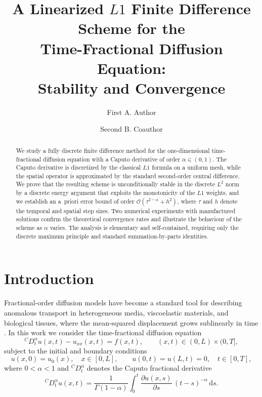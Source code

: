 \documentclass[11pt]{ajam}
\title{A Linearized $L1$ Finite Difference Scheme for the\\
       Time-Fractional Diffusion Equation:\\
       Stability and Convergence}
\author[1]{First A. Author}
\author[1,2]{Second B. Coauthor}
\affil[1]{Laboratory of Applied Mathematics, Kasdi Merbah University, Ouargla, Algeria}
\affil[2]{Department of Mathematics, Partner University, City, Country}
\newcommand{\dtt}{{}^{C}\!D_t^{\alpha}}
\newcommand{\Gam}{\Gamma}
\begin{document}
\maketitle

\begin{abstract}
We study a fully discrete finite difference method for the one-dimensional
time-fractional diffusion equation with a Caputo derivative of order
$\alpha\in(0,1)$. The Caputo derivative is discretized by the classical
$L1$ formula on a uniform mesh, while the spatial operator is approximated
by the standard second-order central difference. We prove that the
resulting scheme is unconditionally stable in the discrete $L^2$ norm by a
discrete energy argument that exploits the monotonicity of the $L1$
weights, and we establish an a~priori error bound of order
$\mathcal{O}(\tau^{2-\alpha}+h^2)$, where $\tau$ and $h$ denote the temporal
and spatial step sizes. Two numerical experiments with manufactured
solutions confirm the theoretical convergence rates and illustrate the
behaviour of the scheme as $\alpha$ varies. The analysis is elementary and
self-contained, requiring only the discrete maximum principle and standard
summation-by-parts identities.
\end{abstract}

\section{Introduction}\label{sec:intro}
Fractional-order diffusion models have become a standard tool for
describing anomalous transport in heterogeneous media, viscoelastic
materials, and biological tissues, where the mean-squared displacement
grows sublinearly in time \citep{Podlubny1999,KilbasSrivastavaTrujillo2006}.
In this work we consider the time-fractional diffusion equation
\begin{equation}\label{eq:pde}
  \dtt u(x,t) - u_{xx}(x,t) = f(x,t),
  \qquad (x,t)\in(0,L)\times(0,T],
\end{equation}
subject to the initial and boundary conditions
\begin{equation}\label{eq:bc}
  u(x,0)=u_0(x),\quad x\in[0,L],
  \qquad u(0,t)=u(L,t)=0,\quad t\in[0,T],
\end{equation}
where $0<\alpha<1$ and $\dtt$ denotes the Caputo fractional derivative
\begin{equation}\label{eq:caputo}
  \dtt u(x,t) = \frac{1}{\Gam(1-\alpha)}\int_{0}^{t}
  \frac{\partial u(x,s)}{\partial s}\,(t-s)^{-\alpha}\,\mathrm{d}s .
\end{equation}
\end{document}
